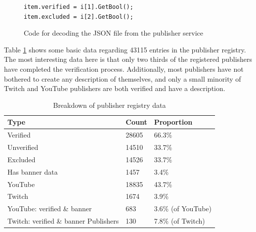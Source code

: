 \documentclass[sigconf]{acmart}
\begin{document}
\begin{figure}
\begin{lstlisting}
item.verified = i[1].GetBool();
item.excluded = i[2].GetBool();
\end{lstlisting}
\caption{Code for decoding the JSON file from the publisher service}
\label{fig:pub_json_decode}
\end{figure}
Table \ref{fig:pub_json_stats} shows some basic data regarding
43115 entries in the publisher registry.
The most interesting data here is that only two thirds
of the registered publishers have completed
the verification process.
Additionally, most publishers have not bothered to
create any description of themselves, and only
a small minority of Twitch and YouTube publishers
are both verified and have a description.

\begin{table}[]
\begin{tabular}{|lll|}
\hline
Type & Count & Proportion \\
\hline
Verified & 28605& 66.3\% \\
Unverified & 14510 & 33.7\% \\
Excluded & 14526& 33.7\% \\
Has banner data & 1457& 3.4\% \\
YouTube & 18835& 43.7\% \\
Twitch & 1674& 3.9\% \\
YouTube: verified \& banner & 683& 3.6\% (of YouTube) \\
Twitch: verified \& banner  Publishers & 130& 7.8\% (of Twitch) \\
\hline
\end{tabular}
\caption{Breakdown of publisher registry data}
\label{fig:pub_json_stats}
\end{table}
\end{document}
